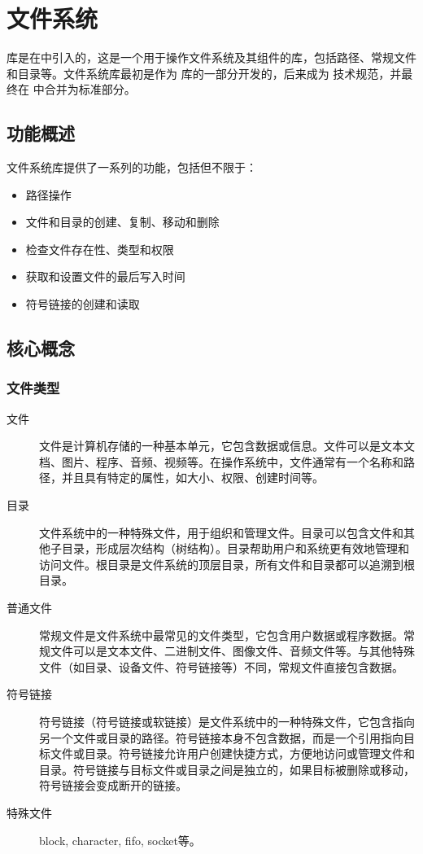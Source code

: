 \chapter{文件系统}
库是在中引入的，这是一个用于操作文件系统及其组件的库，包括路径、常规文件和目录等。文件系统库最初是作为
 库的一部分开发的，后来成为  技术规范，并最终在  中合并为标准部分。

\section{功能概述}
文件系统库提供了一系列的功能，包括但不限于：
\begin{itemize}[label=\daxfile]
	\item 路径操作
	\item 文件和目录的创建、复制、移动和删除
	\item 检查文件存在性、类型和权限
	\item 获取和设置文件的最后写入时间
	\item 符号链接的创建和读取
\end{itemize}

\section{核心概念}
\subsection{文件类型}
\begin{description}
	\item[\faFile 文件] 文件是计算机存储的一种基本单元，它包含数据或信息。文件可以是文本文档、图片、程序、音频、视频等。在操作系统中，文件通常有一个名称和路径，并且具有特定的属性，如大小、权限、创建时间等。
	\item[\daxfolder 目录] 文件系统中的一种特殊文件，用于组织和管理文件。目录可以包含文件和其他子目录，形成层次结构（树结构）。目录帮助用户和系统更有效地管理和访问文件。根目录是文件系统的顶层目录，所有文件和目录都可以追溯到根目录。
	\item[\daxfile 普通文件] 常规文件是文件系统中最常见的文件类型，它包含用户数据或程序数据。常规文件可以是文本文件、二进制文件、图像文件、音频文件等。与其他特殊文件（如目录、设备文件、符号链接等）不同，常规文件直接包含数据。
	\item [\faLink 符号链接]符号链接（符号链接或软链接）是文件系统中的一种特殊文件，它包含指向另一个文件或目录的路径。符号链接本身不包含数据，而是一个引用指向目标文件或目录。符号链接允许用户创建快捷方式，方便地访问或管理文件和目录。符号链接与目标文件或目录之间是独立的，如果目标被删除或移动，符号链接会变成断开的链接。
	\item [\faFile* 特殊文件]block, character, fifo, socket等。
\end{description}

